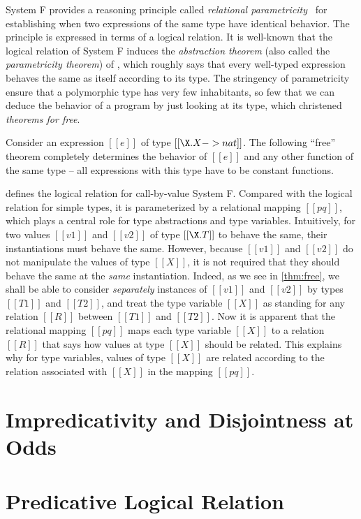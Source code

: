 System F provides a reasoning principle called \textit{relational
  parametricity}~\citep{reynolds1983types} for establishing when two expressions
of the same type have identical behavior. The principle is expressed in terms of
a logical relation. It is well-known that the logical relation of System F
induces the \textit{abstraction theorem} (also called the \textit{parametricity
  theorem}) of \citet{reynolds1983types}, which roughly says that every
well-typed expression behaves the same as itself according to its type. The
stringency of parametricity ensure that a polymorphic type has very few
inhabitants, so few that we can deduce the behavior of a program by just looking
at its type, which \citet{wadler1989theorems} christened \textit{theorems for
  free}.

Consider an expression $[[e]]$ of type $[[ \X . X -> nat ]]$. The following
``free'' theorem completely determines the behavior of $[[e]]$ and any other
function of the same type -- all expressions with this type have to be constant
functions.



 defines the logical relation for call-by-value System F.
Compared with the logical relation for simple types, it is parameterized by a
relational mapping $[[pq]]$, which plays a central role for type abstractions
and type variables. Intuitively, for two values $[[v1]]$ and $[[v2]]$ of type
$[[\X . T]]$ to behave the same, their instantiations must behave the same.
However, because $[[v1]]$ and $[[v2]]$ do not manipulate the values of type
$[[X]]$, it is not required that they should behave the same at the
\textit{same} instantiation. Indeed, as we see in \cref{thm:free}, we shall be
able to consider \textit{separately} instances of $[[v1]]$ and $[[v2]]$ by types
$[[T1]]$ and $[[T2]]$, and treat the type variable $[[X]]$ as standing for any
relation $[[R]]$ between $[[T1]]$ and $[[T2]]$. Now it is apparent that the
relational mapping $[[pq]]$ maps each type variable $[[X]]$ to a relation
$[[R]]$ that says how values at type $[[X]]$ should be related. This explains
why for type variables, values of type $[[X]]$ are related according to the
relation associated with $[[X]]$ in the mapping $[[pq]]$.



\section{Impredicativity and Disjointness at Odds}
\label{sec:failed:lr}





\section{Predicative Logical Relation}
\label{sec:succeed:lr}




